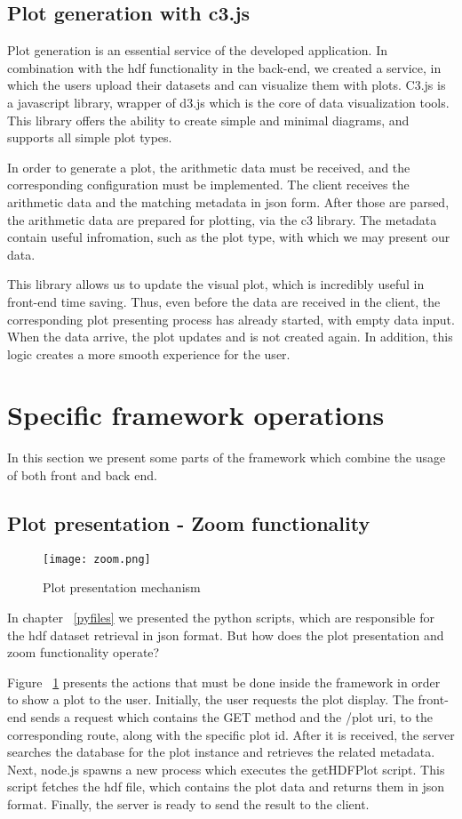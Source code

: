 \subsection{Plot generation with c3.js}
Plot generation is an essential service of the developed application. In combination with the hdf functionality in the back-end, we created a service, in which the users upload their datasets and can visualize them with plots. C3.js is a javascript library, wrapper of d3.js which is the core of data visualization tools. This library offers the ability to create simple and minimal diagrams, and supports all simple plot types. \par 
	In order to generate a plot, the arithmetic data must be received, and the corresponding configuration must be implemented. The client receives the arithmetic data and the matching metadata in json form. After those are parsed, the arithmetic data are prepared for plotting, via the c3 library. The metadata contain useful infromation, such as the plot type, with which we may present our data. \par 
	This library allows us to update the visual plot, which is incredibly useful in front-end time saving. Thus, even before the data are received in the client, the corresponding plot presenting process has already started, with empty data input. When the data arrive, the plot updates and is not created again. In addition, this logic creates a more smooth experience for the user.
	
\section{Specific framework operations}
In this section we present some parts of the framework which combine the usage of both front and back end.

\subsection{Plot presentation - Zoom functionality}
\begin{figure}
	\centerline{\texttt{[image: zoom.png]}}
	\caption{Plot presentation mechanism}
	\label{zoom}
\end{figure}
In chapter ~\ref{pyfiles} we presented the python scripts, which are responsible for the hdf dataset retrieval in json format. But how does the plot presentation and zoom functionality operate?\par 
	Figure ~\ref{zoom} presents the actions that must be done inside the framework in order to show a plot to the user. Initially, the user requests the plot display. The front-end sends a request which contains the GET method and the /plot uri, to the corresponding route, along with the specific plot id. After it is received, the server searches the database for the plot instance and retrieves the related metadata. Next, node.js spawns a new process which executes the getHDFPlot script. This script fetches the hdf file, which contains the plot data and returns them in json format. Finally, the server is ready to send the result to the client. \par 
	
